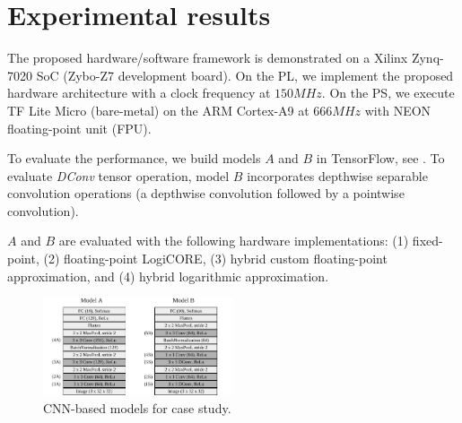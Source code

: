 \section{Experimental results}
\label{sec:experimental_results}
The proposed hardware/software framework is demonstrated on a Xilinx Zynq-7020 SoC (Zybo-Z7 development board). On the PL, we implement the proposed hardware architecture with a clock frequency at $150 MHz$. On the PS, we execute TF Lite Micro (bare-metal) on the ARM Cortex-A9 at $666MHz$ with NEON floating-point unit (FPU)\cite{xilinx2015zynq}.

To evaluate the performance, we build models $A$ and $B$ in TensorFlow, see . To evaluate \emph{DConv} tensor operation, model $B$ incorporates depthwise separable convolution operations (a depthwise convolution followed by
a pointwise convolution).

$A$ and $B$ are evaluated with the following hardware implementations:
(1) fixed-point, (2) floating-point LogiCORE, (3) hybrid custom floating-point approximation, and (4) hybrid logarithmic approximation.


\begin{figure}[t!]
	\centering
	\includegraphics[width=0.5\textwidth]{../figures/models.pdf}
	\caption{CNN-based models for case study.}
	\label{fig:models}
\end{figure}

